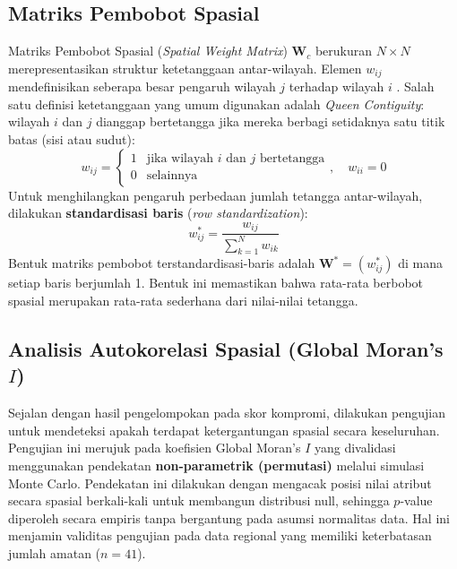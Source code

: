 \subsection{\normalsize Matriks Pembobot Spasial}

Matriks Pembobot Spasial (\textit{Spatial Weight Matrix}) $\mathbf{W}_c$ berukuran $N \times N$ merepresentasikan struktur ketetanggaan antar-wilayah. Elemen $w_{ij}$ mendefinisikan seberapa besar pengaruh wilayah $j$ terhadap wilayah $i$ \citep{anselin1988}. Salah satu definisi ketetanggaan yang umum digunakan adalah \textit{Queen Contiguity}: wilayah $i$ dan $j$ dianggap bertetangga jika mereka berbagi setidaknya satu titik batas (sisi atau sudut):
\begin{equation}
  w_{ij} = \begin{cases} 1 & \text{jika wilayah } i \text{ dan } j \text{ bertetangga} \\ 0 & \text{selainnya} \end{cases}, \quad w_{ii} = 0
\end{equation}
Untuk menghilangkan pengaruh perbedaan jumlah tetangga antar-wilayah, dilakukan \textbf{standardisasi baris} (\textit{row standardization}):
\begin{equation}
  w_{ij}^* = \frac{w_{ij}}{\displaystyle\sum_{k=1}^{N} w_{ik}}
\end{equation}
Bentuk matriks pembobot terstandardisasi-baris adalah $\mathbf{W}^* = (w_{ij}^*)$ di mana setiap baris berjumlah 1. Bentuk ini memastikan bahwa rata-rata berbobot spasial merupakan rata-rata sederhana dari nilai-nilai tetangga.

\subsection{\normalsize Analisis Autokorelasi Spasial (Global Moran's~\texorpdfstring{$I$}{I})}

Sejalan dengan hasil pengelompokan pada skor kompromi, dilakukan pengujian untuk mendeteksi apakah terdapat ketergantungan spasial secara keseluruhan. Pengujian ini merujuk pada koefisien Global Moran's $I$ yang divalidasi menggunakan pendekatan \textbf{non-parametrik (permutasi)} melalui simulasi Monte Carlo. Pendekatan ini dilakukan dengan mengacak posisi nilai atribut secara spasial berkali-kali untuk membangun distribusi null, sehingga $p$-value diperoleh secara empiris tanpa bergantung pada asumsi normalitas data. Hal ini menjamin validitas pengujian pada data regional yang memiliki keterbatasan jumlah amatan ($n=41$).

